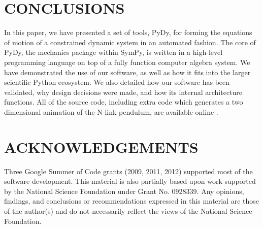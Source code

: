 \documentclass[twocolumn,10pt, final]{asme2e}
\begin{document}

\section*{CONCLUSIONS}
In this paper, we have presented a set of tools, PyDy, for forming the
equations of motion of a constrained dynamic system in an automated fashion.
The core of PyDy, the mechanics package within SymPy, is written in a
high-level programming language on top of a fully function computer algebra
system. We have demonstrated the use of our software, as well as how it fits
into the larger scientific Python ecosystem. We also detailed how our software
has been validated, why design decisions were made, and how its internal
architecture functions. All of the source code, including extra code which
generates a two dimensional animation of the N-link pendulum, are available
online \cite{SourceCode}.

\section*{ACKNOWLEDGEMENTS}
Three Google Summer of Code grants (2009, 2011, 2012) supported most of the
software development. This material is also partially based upon work supported
by the National Science Foundation under Grant No. 0928339. Any opinions,
findings, and conclusions or recommendations expressed in this material are
those of the author(s) and do not necessarily reflect the views of the National
Science Foundation.


\end{document}
